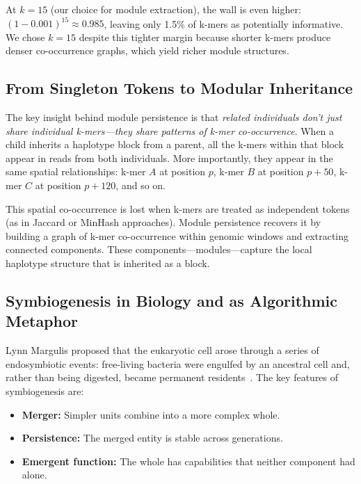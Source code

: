 \documentclass{../yalumba}
\begin{document}
At $k = 15$ (our choice for module extraction), the wall is even higher:
$(1 - 0.001)^{15} \approx 0.985$, leaving only 1.5\% of k-mers as potentially
informative.  We chose $k = 15$ despite this tighter margin because shorter
k-mers produce denser co-occurrence graphs, which yield richer module
structures.

\subsection{From Singleton Tokens to Modular Inheritance}

The key insight behind module persistence is that \emph{related individuals
don't just share individual k-mers---they share patterns of k-mer
co-occurrence}.  When a child inherits a haplotype block from a parent, all the
k-mers within that block appear in reads from both individuals.  More
importantly, they appear in the same spatial relationships: k-mer $A$ at
position $p$, k-mer $B$ at position $p + 50$, k-mer $C$ at position $p + 120$,
and so on.

This spatial co-occurrence is lost when k-mers are treated as independent
tokens (as in Jaccard or MinHash approaches).  Module persistence recovers it
by building a graph of k-mer co-occurrence within genomic windows and
extracting connected components.  These components---modules---capture the
local haplotype structure that is inherited as a block.

\subsection{Symbiogenesis in Biology and as Algorithmic Metaphor}

Lynn Margulis proposed that the eukaryotic cell arose through a series of
endosymbiotic events: free-living bacteria were engulfed by an ancestral cell
and, rather than being digested, became permanent
residents~\cite{margulis1998}.  The key features of symbiogenesis are:

\begin{itemize}
  \item \textbf{Merger:}  Simpler units combine into a more complex whole.
  \item \textbf{Persistence:}  The merged entity is stable across generations.
  \item \textbf{Emergent function:}  The whole has capabilities that neither
        component had alone.
\end{itemize}
\end{document}
